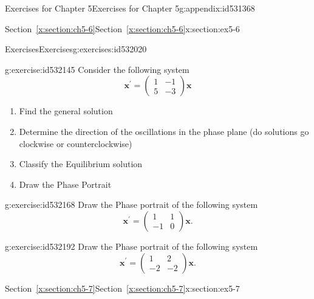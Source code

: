\documentclass[oneside,10pt,]{book}
\newcommand{\xreffont}{\relax}
\numberwithin{equation}{section}
\numberwithin{equation}{section}
\newcommand{\amp}{&}
\begin{document}
\begin{appendixptx}{Exercises for Chapter 5}{}{Exercises for Chapter 5}{}{}{g:appendix:id531368}
\begin{sectionptx}{Section~{\xreffont\ref*{x:section:ch5-6}}}{}{Section~{\xreffont\ref*{x:section:ch5-6}}}{}{}{x:section:ex5-6}
\begin{exercises-subsection-numberless}{Exercises}{}{Exercises}{}{}{g:exercises:id532020}
\begin{divisionexercise}{4}{}{}{g:exercise:id532145}
Consider the following system%
\begin{equation*}
\mathbf{x}^{\prime}=\left(\begin{array}{cc}
1 \amp -1\\
5 \amp -3
\end{array}\right)\mathbf{x}
\end{equation*}
%
%
\begin{enumerate}[label=(\alph*)]
\item{}Find the general solution%
\item{}Determine the direction of the oscillations in the phase plane (do solutions go clockwise or counterclockwise)%
\item{}Classify the Equilibrium solution%
\item{}Draw the Phase Portrait%
\end{enumerate}
\end{divisionexercise}%
\begin{divisionexercise}{5}{}{}{g:exercise:id532168}%
Draw the Phase portrait of the following system%
\begin{equation*}
\mathbf{x}^{\prime}=\left(\begin{array}{cc}
1 \amp 1\\
-1 \amp 0
\end{array}\right)\mathbf{x}.
\end{equation*}
%
\end{divisionexercise}%
\begin{divisionexercise}{6}{}{}{g:exercise:id532192}%
Draw the Phase portrait of the following system%
\begin{equation*}
\mathbf{x}^{\prime}=\left(\begin{array}{cc}
1 \amp 2\\
-2 \amp -2
\end{array}\right)\mathbf{x}.
\end{equation*}
%
\end{divisionexercise}%
\end{exercises-subsection-numberless}
\end{sectionptx}
%
%
\typeout{************************************************}
\typeout{Section F.7 Section~{\xreffont\ref*{x:section:ch5-7}}}
\typeout{************************************************}
%
\begin{sectionptx}{Section~{\xreffont\ref*{x:section:ch5-7}}}{}{Section~{\xreffont\ref*{x:section:ch5-7}}}{}{}{x:section:ex5-7}
%
%
\typeout{************************************************}

\end{sectionptx}
\end{appendixptx}
\end{document}

